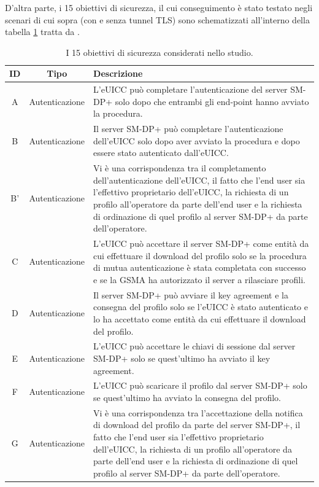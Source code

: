 \documentclass[10pt, oneside]{book}
\begin{document}
\noindent D'altra parte, i 15 obiettivi di sicurezza, il cui conseguimento è stato testato negli scenari di cui sopra (con e senza tunnel TLS) sono schematizzati all'interno della tabella \ref{tab:security-goals} tratta da \cite{Sec-analysis}.
\begin{table}[h!]
\begin{center}
\captionsetup{skip=4pt}
\caption{I 15 obiettivi di sicurezza considerati nello studio.}
\label{tab:security-goals}
\begin{tabularx}{\textwidth}{|c|c|X|} %
\hline
\textbf{ID} & \textbf{Tipo} & \textbf{Descrizione}\\
\hline
A & Autenticazione & L'eUICC può completare l'autenticazione del server SM-DP+ solo dopo che entrambi gli end-point hanno avviato la procedura.\\
\hline
B & Autenticazione & Il server SM-DP+ può completare l'autenticazione dell'eUICC solo dopo aver avviato la procedura e dopo essere stato autenticato dall'eUICC.\\
\hline
B' & Autenticazione & Vi è una corrispondenza tra il completamento dell'autenticazione dell'eUICC, il fatto che l'end user sia l'effettivo proprietario dell'eUICC, la richiesta di un profilo all'operatore da parte dell'end user e la richiesta di ordinazione di quel profilo al server SM-DP+ da parte dell'operatore.\\
\hline
C & Autenticazione & L'eUICC può accettare il server SM-DP+ come entità da cui effettuare il download del profilo solo se la procedura di mutua autenticazione è stata completata con successo e se la GSMA ha autorizzato il server a rilasciare profili.\\
\hline
D & Autenticazione & Il server SM-DP+ può avviare il key agreement e la consegna del profilo solo se l'eUICC è stato autenticato e lo ha accettato come entità da cui effettuare il download del profilo.\\
\hline
E & Autenticazione & L'eUICC può accettare le chiavi di sessione dal server SM-DP+ solo se quest'ultimo ha avviato il key agreement.\\
\hline
F & Autenticazione & L'eUICC può scaricare il profilo dal server SM-DP+ solo se quest'ultimo ha avviato la consegna del profilo.\\
\hline
G & Autenticazione & Vi è una corrispondenza tra l'accettazione della notifica di download del profilo da parte del server SM-DP+, il fatto che l'end user sia l'effettivo proprietario dell'eUICC, la richiesta di un profilo all'operatore da parte dell'end user e la richiesta di ordinazione di quel profilo al server SM-DP+ da parte dell'operatore.\\

\end{tabularx}
\end{center}
\end{table}
\end{document}
